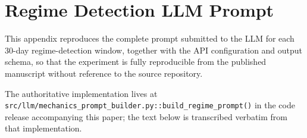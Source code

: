\documentclass[jrfm,article,accept,moreauthors,pdftex]{Definitions/mdpi}
\begin{document}




\appendixstart
\appendix



\section[Regime Detection LLM Prompt]{Regime Detection LLM Prompt}
\label{app:prompt}

This appendix reproduces the complete prompt submitted to the LLM for
each 30-day regime-detection window, together with the API configuration
and output schema, so that the experiment is fully reproducible from the
published manuscript without reference to the source repository.

The authoritative implementation lives at
\texttt{src/llm/mechanics\_prompt\_builder.py::}\linebreak \texttt{build\_regime\_prompt()}
in the code release accompanying this paper; the text below is
transcribed verbatim from that implementation.
\end{document}
